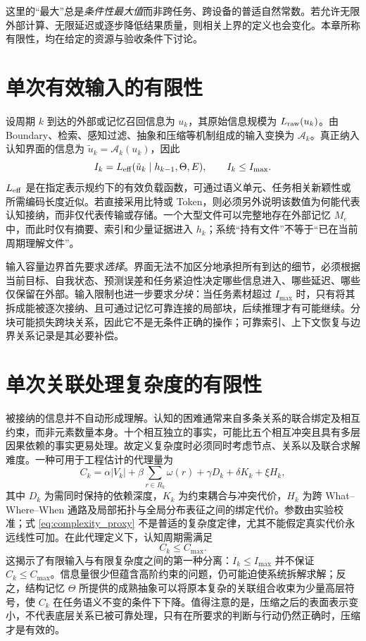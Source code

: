这里的“最大”总是\emph{条件性最大值}而非跨任务、跨设备的普适自然常数。若允许无限外部计算、无限延迟或逐步降低结果质量，则相关上界的定义也会变化。本章所称有限性，均在给定的资源与验收条件下讨论。

\section{单次有效输入的有限性}
\label{sec:input_bound}

设周期 $k$ 到达的外部或记忆召回信息为 $u_k$，其原始信息规模为 $L_{\rm raw}(u_k)$。由 Boundary、检索、感知过滤、抽象和压缩等机制组成的输入变换为 $\mathcal A_k$。真正纳入认知界面的信息为 $\tilde u_k=\mathcal A_k(u_k)$，因此
\begin{equation}
 I_k=L_{\rm eff}(\tilde u_k\mid h_{k-1},\Theta,E),\qquad I_k\leq I_{\max}.
 \label{eq:input_capacity}
\end{equation}
$L_{\rm eff}$ 是在指定表示规约下的有效负载函数，可通过语义单元、任务相关新颖性或所需编码长度近似。若直接采用比特或 Token，则必须另外说明该数值为何能代表认知接纳，而非仅代表传输或存储。一个大型文件可以完整地存在外部记忆 $M_e$ 中，而此时仅有摘要、索引和少量证据进入 $h_k$；系统“持有文件”不等于“已在当前周期理解文件”。

输入容量边界首先要求\emph{选择}。界面无法不加区分地承担所有到达的细节，必须根据当前目标、自我状态、预测误差和任务紧迫性决定哪些信息进入、哪些延迟、哪些仅保留在外部。输入限制也进一步要求\emph{分块}：当任务素材超过 $I_{\max}$ 时，只有将其拆成能被逐次接纳、且可通过记忆可靠连接的局部块，后续推理才有可能继续。分块可能损失跨块关系，因此它不是无条件正确的操作；可靠索引、上下文恢复与边界关系记录是其必要补偿。

\section{单次关联处理复杂度的有限性}
\label{sec:complexity_bound}

被接纳的信息并不自动形成理解。认知的困难通常来自多条关系的联合绑定及相互约束，而非元素数量本身。十个相互独立的事实，可能比五个相互冲突且具有多层因果依赖的事实更易处理。故定义复杂度时必须同时考虑节点、关系以及联合求解难度。一种可用于工程估计的代理量为
\begin{equation}
 C_k=\alpha |V_k|+\beta\sum_{r\in R_k}\omega(r)+\gamma D_k+\delta K_k+\xi H_k,
 \label{eq:complexity_proxy}
\end{equation}
其中 $D_k$ 为需同时保持的依赖深度，$K_k$ 为约束耦合与冲突代价，$H_k$ 为跨 What--Where--When 通路及局部拓扑与全局分布表征之间的绑定代价。参数由实验校准；式 \eqref{eq:complexity_proxy} 不是普适的复杂度定律，尤其不能假定真实代价永远线性可加。在此代理定义下，认知周期需满足
\begin{equation}
 C_k\leq C_{\max}.
 \label{eq:complexity_limit}
\end{equation}
这揭示了有限输入与有限复杂度之间的第一种分离：$I_k\leq I_{\max}$ 并不保证 $C_k\leq C_{\max}$。信息量很少但蕴含高阶约束的问题，仍可能迫使系统拆解求解；反之，结构记忆 $\Theta$ 所提供的成熟抽象可以将原本复杂的关联组合收束为少量高层符号，使 $C_k$ 在任务语义不变的条件下下降。值得注意的是，压缩之后的表面表示变小，不代表底层关系已被可靠处理，只有在所要求的判断与行动仍然正确时，压缩才是有效的。

